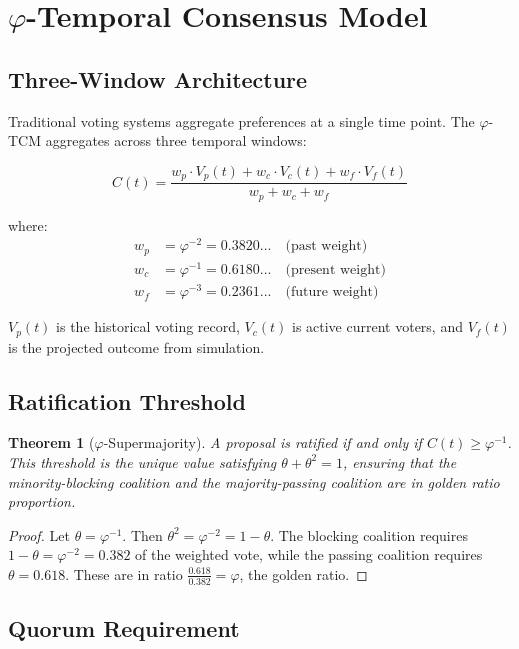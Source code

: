 \documentclass[11pt,twocolumn]{article}
\newtheorem{theorem}{Theorem}
\begin{document}
\section{$\varphi$-Temporal Consensus Model}

\subsection{Three-Window Architecture}

Traditional voting systems aggregate preferences at a single time point.
The $\varphi$-TCM aggregates across three temporal windows:

\begin{equation}
C(t) = \frac{w_p \cdot V_p(t) + w_c \cdot V_c(t) + w_f \cdot V_f(t)}{w_p + w_c + w_f}
\end{equation}

where:
\begin{align}
w_p &= \varphi^{-2} = 0.3820... \quad \text{(past weight)} \\
w_c &= \varphi^{-1} = 0.6180... \quad \text{(present weight)} \\
w_f &= \varphi^{-3} = 0.2361... \quad \text{(future weight)}
\end{align}

$V_p(t)$ is the historical voting record, $V_c(t)$ is active current voters,
and $V_f(t)$ is the projected outcome from simulation.

\subsection{Ratification Threshold}

\begin{theorem}[$\varphi$-Supermajority]
A proposal is ratified if and only if $C(t) \geq \varphi^{-1}$. This threshold
is the unique value satisfying $\theta + \theta^2 = 1$, ensuring that the
minority-blocking coalition and the majority-passing coalition are in golden
ratio proportion.
\end{theorem}

\begin{proof}
Let $\theta = \varphi^{-1}$. Then $\theta^2 = \varphi^{-2} = 1 - \theta$.
The blocking coalition requires $1 - \theta = \varphi^{-2} = 0.382$ of the
weighted vote, while the passing coalition requires $\theta = 0.618$. These
are in ratio $\frac{0.618}{0.382} = \varphi$, the golden ratio.
\end{proof}

\subsection{Quorum Requirement}
\end{document}
